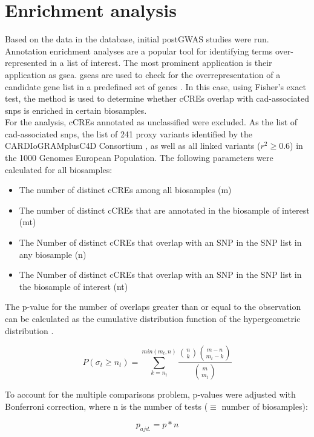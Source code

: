 \section{Enrichment analysis}
\label{sec:enrichment}
Based on the data in the database, initial postGWAS studies were run. Annotation enrichment analyses are a popular tool for identifying terms over-represented in a list of interest. The most prominent application is their application as \ac{gsea}. \Acp{gsea} are used to check for the overrepresentation of a candidate gene list in a predefined set of genes \cite{tipneyIntroductionEffectiveUse2010}. In this case, using Fisher's exact test, the method is used to determine whether \acp{cCRE} overlap with \ac{cad}-associated \acp{snp} is enriched in certain biosamples.\\
For the analysis, \acp{cCRE} annotated as unclassified were excluded. As the list of \ac{cad}-associated \acp{snp}, the list of 241 proxy variants identified by the CARDIoGRAMplusC4D Consortium \cite{aragamDiscoverySystematicCharacterization2021}, as well as all linked variants ($r^2\geq0.6$) in the 1000 Genomes European Population. The following parameters were calculated for all biosamples:

\begin{itemize}
    \item The number of distinct \acp{cCRE} among all biosamples (m)
    \item The number of distinct \acp{cCRE} that are annotated in the biosample of interest (mt)
    \item The Number of distinct \acp{cCRE} that overlap with an SNP in the SNP list in any biosample (n)
    \item The Number of distinct \acp{cCRE} that overlap with an SNP in the SNP list in the biosample of interest (nt)
\end{itemize}

The p-value for the number of overlaps greater than or equal to the observation can be calculated as the cumulative distribution function of the hypergeometric distribution \cite{virtanenSciPyFundamentalAlgorithms2020}.

$$ P(\sigma_t\geq n_t) = \sum_{k=n_t}^{min(m_t, n)} \frac{\binom{n}{k}\binom{m-n}{m_t-k}}{\binom{m}{m_t}} $$

To account for the multiple comparisons problem, p-values were adjusted with Bonferroni correction, where n is the number of tests ($\equiv$ number of biosamples):

$$ p_{ajd.} = p*n$$

